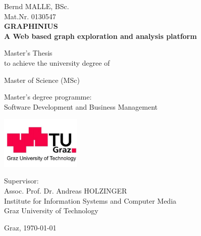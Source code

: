 
\begin{center}

{\large Bernd MALLE, BSc.} \\
{\large Mat.Nr. 0130547} \\
\vspace{1cm}
{\LARGE \textbf
{
GRAPHINIUS\\ A Web based graph exploration and analysis platform\\
}
}
\vspace{2cm}

{\larger
Master's Thesis \\[1ex]
to achieve the university degree of

Master of Science (MSc)

Master's degree programme:\\ 
Software Development and Business Management

}

\end{center}

\vspace{1cm}

\begin{center}
\includegraphics[height=2.5cm]{figures/tuglogo}

\vspace{2cm} %

{
Supervisor:\\
Assoc. Prof. Dr. Andreas HOLZINGER\\

Institute for Information Systems and Computer Media\\
Graz University of Technology


}
\vspace{1cm}

{
Graz, \today \\
}

\end{center}





